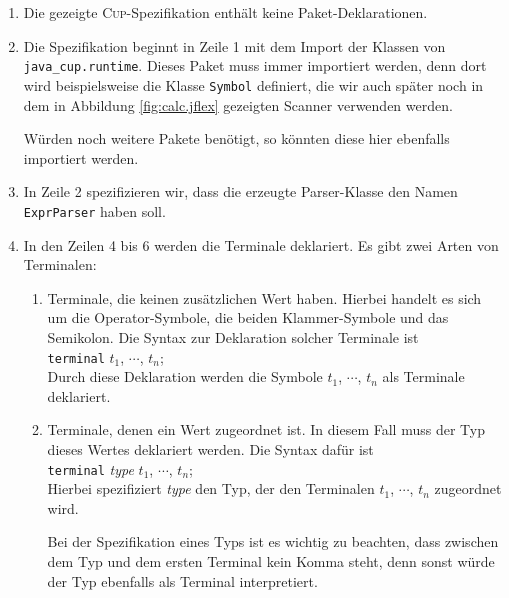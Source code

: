 \begin{enumerate}
\item Die gezeigte \textsc{Cup}-Spezifikation enth\"alt keine Paket-Deklarationen.
\item Die Spezifikation beginnt in Zeile 1 mit dem Import der Klassen von
      \texttt{java\_cup.runtime}.  Dieses Paket muss immer importiert werden, denn dort wird
      beispielsweise die Klasse \texttt{Symbol} 
      definiert, die wir auch sp\"ater noch in dem in Abbildung \ref{fig:calc.jflex} gezeigten Scanner
      verwenden werden.

      W\"urden noch weitere Pakete ben\"otigt, so k\"onnten diese hier ebenfalls importiert werden.
\item In Zeile 2 spezifizieren wir, dass die erzeugte Parser-Klasse den Namen \texttt{ExprParser}
      haben soll.
\item In den Zeilen 4 bis 6 werden die Terminale deklariert.  Es gibt zwei Arten von Terminalen:
      \begin{enumerate}
      \item Terminale, die keinen zus\"atzlichen Wert haben.  Hierbei handelt es sich 
            um die Operator-Symbole, die beiden Klammer-Symbole und das Semikolon.  Die Syntax zur
            Deklaration solcher Terminale ist 
            \\[0.2cm]
            \hspace*{1.3cm}
            \texttt{terminal} $t_1$, $\cdots$, $t_n$;
            \\[0.2cm]
            Durch diese Deklaration werden die Symbole $t_1$, $\cdots$, $t_n$ als Terminale
            deklariert.
      \item Terminale, denen ein Wert zugeordnet ist.  In diesem Fall muss der Typ
            dieses Wertes deklariert werden.  Die Syntax daf\"ur ist 
            \\[0.2cm]
            \hspace*{1.3cm}
            \texttt{terminal} \textsl{type} $t_1$, $\cdots$, $t_n$;
            \\[0.2cm]
            Hierbei spezifiziert \textsl{type} den Typ, der den Terminalen $t_1$, $\cdots$, $t_n$
            zugeordnet wird.
            
            Bei der Spezifikation eines Typs ist es wichtig zu beachten, dass zwischen dem Typ und
            dem ersten Terminal kein Komma steht, denn sonst w\"urde der Typ ebenfalls als Terminal
            interpretiert.  
            

\end{enumerate}
\end{enumerate}
